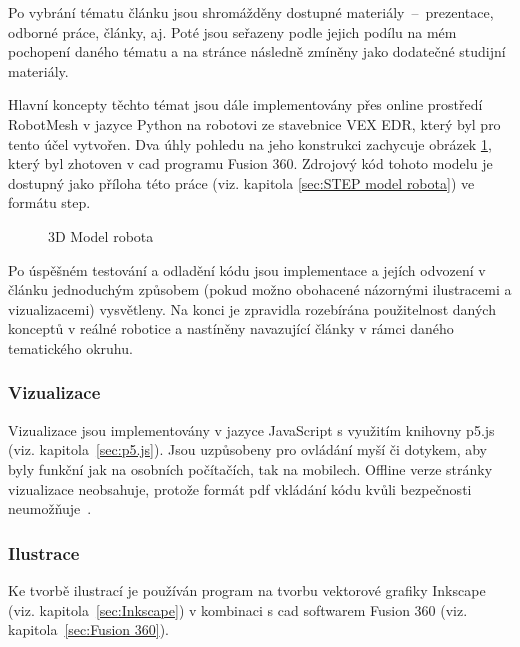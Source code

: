 \documentclass[a4paper, 12pt]{article}
\begin{document}
  Po vybrání tématu článku jsou shromážděny dostupné materiály~--~prezentace, odborné práce, články, aj. Poté jsou seřazeny podle jejich podílu na mém pochopení daného tématu a na stránce následně zmíněny jako dodatečné studijní materiály.

  Hlavní koncepty těchto témat jsou dále implementovány přes online prostředí RobotMesh v jazyce Python na robotovi ze stavebnice VEX EDR, který byl pro tento účel vytvořen. Dva úhly pohledu na jeho konstrukci zachycuje obrázek \ref{img:3D Model robota}, který byl zhotoven v \gls{cad} programu Fusion 360. Zdrojový kód tohoto modelu je dostupný jako příloha této práce (viz. kapitola \ref{sec:STEP model robota}) ve formátu \gls{step}.

  \begin{figure}[H]%
    \centering

    \hfill

    \caption{3D Model robota}%
    \label{img:3D Model robota}%
  \end{figure}

  Po úspěšném testování a odladění kódu jsou implementace a jejích odvození v článku jednoduchým způsobem (pokud možno obohacené názornými ilustracemi a vizualizacemi) vysvětleny. Na konci je zpravidla rozebírána použitelnost daných konceptů v reálné robotice a nastíněny navazující články v rámci daného tematického okruhu.


  \subsubsection{Vizualizace} \label{sec:Vizualizace}
  Vizualizace jsou implementovány v jazyce JavaScript s využitím knihovny p5.js (viz. kapitola~\ref{sec:p5.js}). Jsou uzpůsobeny pro ovládání myší či dotykem, aby byly funkční jak na osobních počítačích, tak na mobilech. Offline verze stránky vizualizace neobsahuje, protože formát \gls{pdf} vkládání kódu kvůli bezpečnosti neumožňuje~\cite{history-of-pdf}.


  \subsubsection{Ilustrace} \label{sec:Ilustrace}
  Ke tvorbě ilustrací je používán program na tvorbu vektorové grafiky Inkscape (viz. kapitola~\ref{sec:Inkscape}) v kombinaci s \gls{cad} softwarem Fusion 360 (viz. kapitola~\ref{sec:Fusion 360}).
\end{document}
